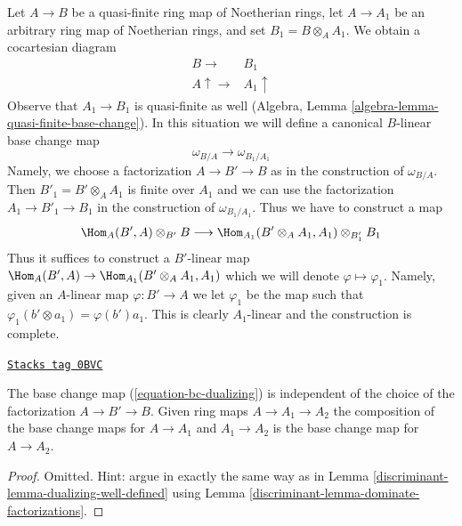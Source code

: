 Let $A \to B$ be a quasi-finite ring map of Noetherian rings, let
$A \to A_1$ be an arbitrary ring map of Noetherian rings, and set
$B_1 = B \otimes_A A_1$. We obtain a cocartesian diagram
$$
\begin{array}{cc}B \longrightarrow & B_1 \\ A \uparrow\longrightarrow & A_1 \uparrow\end{array}
$$
Observe that $A_1 \to B_1$ is quasi-finite as well (Algebra, Lemma
\ref{algebra-lemma-quasi-finite-base-change}).
In this situation we will define a canonical
$B$-linear base change map
\begin{equation}
\label{equation-bc-dualizing}
\omega_{B/A} \longrightarrow \omega_{B_1/A_1}
\end{equation}
Namely, we choose a factorization $A \to B' \to B$ as in the construction
of $\omega_{B/A}$. Then $B'_1 = B' \otimes_A A_1$ is finite over $A_1$
and we can use the factorization $A_1 \to B'_1 \to B_1$ in the construction
of $\omega_{B_1/A_1}$. Thus we have to construct a map
$$
\Hom_A(B', A) \otimes_{B'} B
\longrightarrow
\Hom_{A_1}(B' \otimes_A A_1, A_1) \otimes_{B'_1} B_1
$$
Thus it suffices to construct a $B'$-linear map
$\Hom_A(B', A) \to \Hom_{A_1}(B' \otimes_A A_1, A_1)$
which we will denote $\varphi \mapsto \varphi_1$.
Namely, given an $A$-linear map $\varphi : B' \to A$ we
let $\varphi_1$ be the map such that
$\varphi_1(b' \otimes a_1) = \varphi(b')a_1$.
This is clearly $A_1$-linear and the construction is complete.

\begin{lemma}
\label{discriminant-lemma-bc-map-dualizing}
\href{https://stacks.math.columbia.edu/tag/0BVC}{\texttt{Stacks tag 0BVC}}

The base change map (\ref{equation-bc-dualizing})
is independent of the choice of the
factorization $A \to B' \to B$. Given ring maps $A \to A_1 \to A_2$
the composition of the base change maps for $A \to A_1$ and $A_1 \to A_2$
is the base change map for $A \to A_2$.
\end{lemma}

\begin{proof}

Omitted. Hint: argue in exactly the same way as in
Lemma \ref{discriminant-lemma-dualizing-well-defined}
using Lemma \ref{discriminant-lemma-dominate-factorizations}.
\end{proof}

